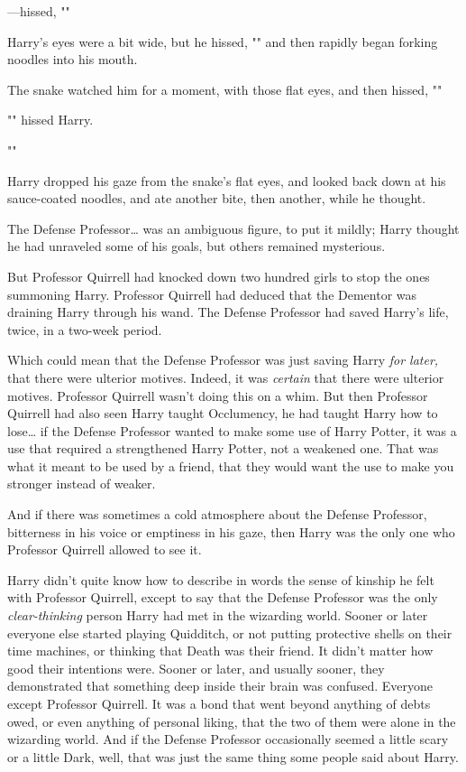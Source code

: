 ---hissed, ""

Harry's eyes were a bit wide, but he hissed, ""
and then rapidly began forking noodles into his mouth.

The snake watched him for a moment, with those flat eyes, and then hissed,
""

"" hissed Harry.

""

Harry dropped his gaze from the snake's flat eyes, and looked back down at his
sauce-coated noodles, and ate another bite, then another, while he thought.

The Defense Professor{\ldots} was an ambiguous figure, to put it mildly; Harry
thought he had unraveled some of his goals, but others remained mysterious.

But Professor Quirrell had knocked down two hundred girls to stop the ones
summoning Harry. Professor Quirrell had deduced that the Dementor was draining
Harry through his wand. The Defense Professor had saved Harry's life, twice, in
a two-week period.

Which could mean that the Defense Professor was just saving Harry \emph{for
later,} that there were ulterior motives. Indeed, it was \emph{certain} that
there were ulterior motives. Professor Quirrell wasn't doing this on a whim.
But then Professor Quirrell had also seen Harry taught Occlumency, he had
taught Harry how to lose{\ldots} if the Defense Professor wanted to make some
use of Harry Potter, it was a use that required a strengthened Harry Potter,
not a weakened one. That was what it meant to be used by a friend, that they
would want the use to make you stronger instead of weaker.

And if there was sometimes a cold atmosphere about the Defense Professor,
bitterness in his voice or emptiness in his gaze, then Harry was the only one
who Professor Quirrell allowed to see it.

Harry didn't quite know how to describe in words the sense of kinship he felt
with Professor Quirrell, except to say that the Defense Professor was the only
\emph{clear-thinking} person Harry had met in the wizarding world. Sooner or
later everyone else started playing Quidditch, or not putting protective shells
on their time machines, or thinking that Death was their friend. It didn't
matter how good their intentions were. Sooner or later, and usually sooner,
they demonstrated that something deep inside their brain was confused. Everyone
except Professor Quirrell. It was a bond that went beyond anything of debts
owed, or even anything of personal liking, that the two of them were alone in
the wizarding world. And if the Defense Professor occasionally seemed a little
scary or a little Dark, well, that was just the same thing some people said
about Harry.

